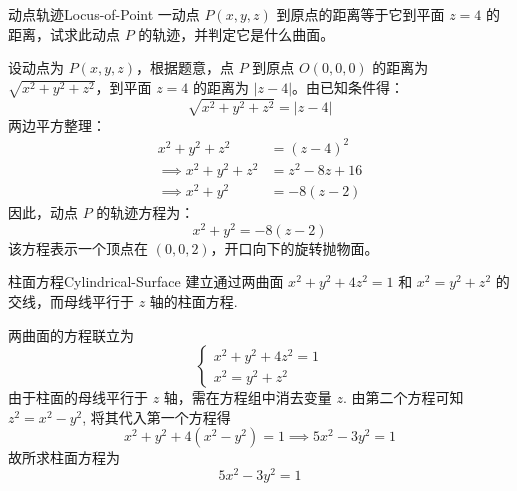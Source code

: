 \begin{problem}{动点轨迹}{Locus-of-Point}
    一动点 $P(x, y, z)$ 到原点的距离等于它到平面 $z = 4$ 的距离，试求此动点 $P$ 的轨迹，并判定它是什么曲面。
\end{problem}

\begin{solution}
    设动点为 $P(x, y, z)$，根据题意，点 $P$ 到原点 $O(0, 0, 0)$ 的距离为 $\sqrt{x^2 + y^2 + z^2}$，到平面 $z = 4$ 的距离为 $|z - 4|$。由已知条件得：
    \begin{equation}
        \sqrt{x^2 + y^2 + z^2} = |z - 4|
    \end{equation}
    两边平方整理：
    \begin{equation}
        \begin{aligned}
            x^2 + y^2 + z^2          & = (z - 4)^2     \\
            \implies x^2 + y^2 + z^2 & = z^2 - 8z + 16 \\
            \implies x^2 + y^2       & = -8(z - 2)
        \end{aligned}
    \end{equation}
    因此，动点 $P$ 的轨迹方程为：
    \begin{equation}
        \boxed{x^2 + y^2 = -8(z - 2)}
    \end{equation}
    该方程表示一个顶点在 $(0, 0, 2)$，开口向下的旋转抛物面。
\end{solution}


\begin{problem}{柱面方程}{Cylindrical-Surface}
    建立通过两曲面 $x^2 + y^2 + 4z^2 = 1$ 和 $x^2 = y^2 + z^2$ 的交线，而母线平行于 $z$ 轴的柱面方程.
\end{problem}

\begin{solution}
    两曲面的方程联立为
    \begin{equation}
        \begin{cases}
            x^2 + y^2 + 4z^2 = 1 \\
            x^2 = y^2 + z^2
        \end{cases}
    \end{equation}
    由于柱面的母线平行于 $z$ 轴，需在方程组中消去变量 $z$. 由第二个方程可知 $z^2 = x^2 - y^2$, 将其代入第一个方程得
    \begin{equation}
        x^2 + y^2 + 4(x^2 - y^2) = 1 \implies 5x^2 - 3y^2 = 1
    \end{equation}
    故所求柱面方程为
    \begin{equation}
        \boxed{5x^2 - 3y^2 = 1}
    \end{equation}
\end{solution}


